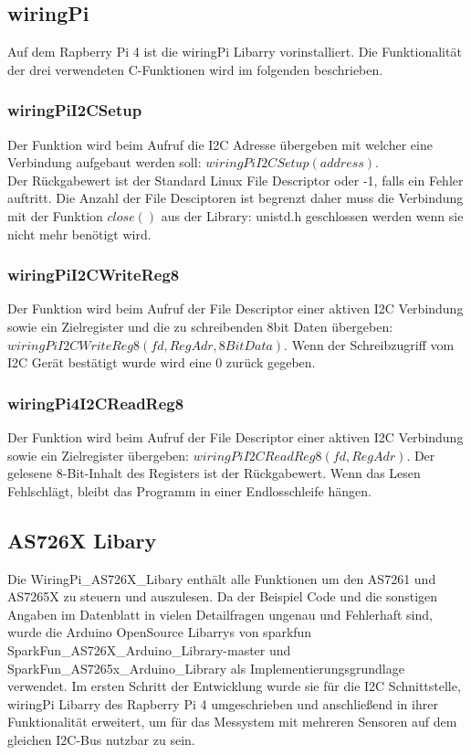 \subsection{wiringPi}
Auf dem Rapberry Pi 4 ist die  wiringPi Libarry vorinstalliert. 
Die Funktionalität der drei verwendeten C-Funktionen wird im folgenden beschrieben.

\subsubsection{wiringPiI2CSetup}
Der Funktion wird beim Aufruf die I2C Adresse übergeben mit welcher eine Verbindung aufgebaut werden soll: $wiringPiI2CSetup(address)$.\\
Der Rückgabewert ist der Standard Linux File Descriptor oder -1, falls ein Fehler auftritt. 
Die Anzahl der File Desciptoren ist begrenzt daher muss die Verbindung mit der Funktion $close()$ aus der Library: unistd.h geschlossen werden wenn sie nicht mehr benötigt wird.

\subsubsection{wiringPiI2CWriteReg8}
Der Funktion wird beim Aufruf der File Descriptor einer aktiven I2C Verbindung sowie ein Zielregister und die zu schreibenden 8bit Daten übergeben:\\ $wiringPiI2CWriteReg8 (fd, RegAdr, 8BitData)$.
Wenn der Schreibzugriff vom I2C Gerät bestätigt wurde wird eine 0 zurück gegeben.
\subsubsection{wiringPi4I2CReadReg8}
Der Funktion wird beim Aufruf der File Descriptor einer aktiven I2C Verbindung sowie ein Zielregister übergeben: $wiringPiI2CReadReg8(fd, RegAdr)$.
Der gelesene 8-Bit-Inhalt des Registers ist der Rückgabewert.
Wenn das Lesen Fehlschlägt, bleibt das Programm in einer Endlosschleife hängen.

\subsection{AS726X Libary}
Die WiringPi\_AS726X\_Libary enthält alle Funktionen um den AS7261 und AS7265X zu steuern und auszulesen.
Da der Beispiel Code und die sonstigen Angaben im Datenblatt in vielen Detailfragen ungenau und Fehlerhaft sind, wurde die Arduino OpenSource Libarrys von sparkfun SparkFun\_AS726X\_Arduino\_Library-master und SparkFun\_AS7265x\_Arduino\_Library als Implementierungsgrundlage verwendet.
Im ersten Schritt der Entwicklung wurde sie für die I2C Schnittstelle, wiringPi Libarry des Rapberry Pi 4 umgeschrieben und anschließend in ihrer Funktionalität erweitert, um für das Messystem mit mehreren Sensoren auf dem gleichen I2C-Bus nutzbar zu sein. \\

